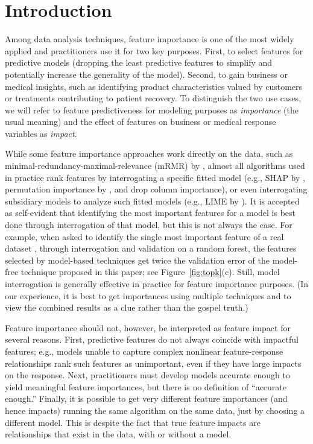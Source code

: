 \documentclass[11pt]{article}
\newcommand{\figref}[1]{Figure~\ref{#1}}
\begin{document}
\section{Introduction}
\label{sec:intro}

Among data analysis techniques, feature importance is one of the most widely applied and practitioners use it for two key purposes. First, to select features for predictive models (dropping the least predictive features to simplify and potentially increase the generality of the model). Second, to gain business or medical insights, such as identifying product characteristics valued by customers or treatments contributing to patient recovery.  To distinguish the two use cases, we will refer to feature predictiveness for modeling purposes as {\em importance} (the usual meaning) and the effect of features on business or medical response variables as {\em impact}.

While some feature importance approaches work directly on the data, such as minimal-redundancy-maximal-relevance (mRMR) by \cite{mRMR}, almost all algorithms used in practice rank features by interrogating a specific fitted model (e.g., SHAP by \citealt{shap}, permutation importance by \citealt{RF}, and drop column importance), or even interrogating subsidiary models to analyze such fitted models (e.g., LIME by \citealt{lime}). It is accepted as self-evident that identifying the most important features for a model is best done through interrogation of that  model, but this is not always the case.  For example, when asked to identify the single most important feature of a real dataset \citep{bulldozer}, through interrogation and validation on a random forest, the features selected by model-based techniques get twice the validation error of the model-free technique proposed in this paper; see \figref{fig:topk}(c). Still, model interrogation is generally effective in practice for feature importance purposes. (In our experience, it is best to get importances using multiple techniques and to view the combined results as a clue rather than the gospel truth.)

Feature importance should not, however, be interpreted as feature impact for several reasons. First, predictive features do not always coincide with impactful features; e.g., models unable to capture complex nonlinear feature-response relationships rank such features as unimportant, even if they have large impacts on the response. Next, practitioners must develop models accurate enough to yield meaningful feature importances, but there is no definition of ``accurate enough.'' Finally, it is possible to get very different feature importances (and hence impacts) running the same algorithm on the same data, just by choosing a different model. This is despite the fact that true feature impacts are relationships that exist in the data, with or without a model.
\end{document}
